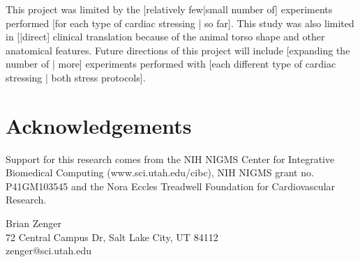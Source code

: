 \documentclass[twocolumn]{cinc}
\begin{document}
This project was limited by the [relatively few|small number of]
experiments performed [for each type of cardiac stressing | so far]. This
study was also limited in [|direct] clinical translation because of the
animal torso shape and other anatomical features. Future directions of this
project will include [expanding the number of | more] experiments performed
with [each different type of cardiac stressing | both stress protocols].


\balance


\section*{Acknowledgements}  
% 
Support for this research comes from the NIH NIGMS Center for Integrative
Biomedical Computing (www.sci.utah.edu/cibc), NIH NIGMS grant
no. P41GM103545 and the Nora Eccles Treadwell Foundation for Cardiovascular
Research.






\begin{correspondence}
Brian Zenger\\
72 Central Campus Dr, Salt Lake City, UT 84112\\
zenger@sci.utah.edu
\end{correspondence}

\end{document}
